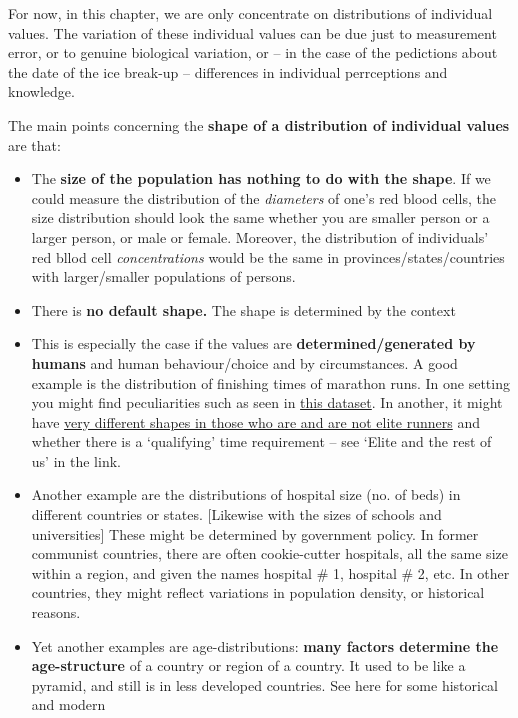 \documentclass[]{book}
\begin{document}
For now, in this chapter, we are only concentrate on distributions of individual values. The variation of these individual values can be due just to measurement error, or to genuine biological variation, or -- in the case of the pedictions about the date of the ice break-up -- differences in individual perrceptions and knowledge.

The main points concerning the \textbf{shape of a distribution of individual values} are that:

\begin{itemize}
\item
  The \textbf{size of the population has nothing to do with the shape}. If we could measure the distribution of the \emph{diameters} of one's red blood cells, the size distribution should look the same whether you are smaller person or a larger person, or male or female. Moreover, the distribution of individuals' red bllod cell \emph{concentrations} would be the same in provinces/states/countries with larger/smaller populations of persons.
\item
  There is \textbf{no default shape.} The shape is determined by the context
\item
  This is especially the case if the values are \textbf{determined/generated by humans} and human behaviour/choice and by circumstances. A good example is the distribution of finishing times of marathon runs. In one setting you might find peculiarities such as seen in
  \href{http://www.medicine.mcgill.ca/epidemiology/hanley/statbook/HumanBehaviourDistributionsMarathons.pdf\#page=14}{this dataset}. In another, it might have \href{https://susanli2016.github.io/Boston-Marathon/}{very different shapes in those who are and are not elite runners} and whether there is a `qualifying' time requirement -- see `Elite and the rest of us' in the link.
\item
  Another example are the distributions of hospital size (no. of beds) in different countries or states. {[}Likewise with the sizes of schools and universities{]} These might be determined by government policy. In former communist countries, there are often cookie-cutter hospitals, all the same size within a region, and given the names hospital \# 1, hospital \# 2, etc. In other countries, they might reflect variations in population density, or historical reasons.
\item
  Yet another examples are age-distributions: \textbf{many factors determine the age-structure} of a country or region of a country. It used to be like a pyramid, and still is in less developed countries. See here for some historical and modern

\end{itemize}
\end{document}
